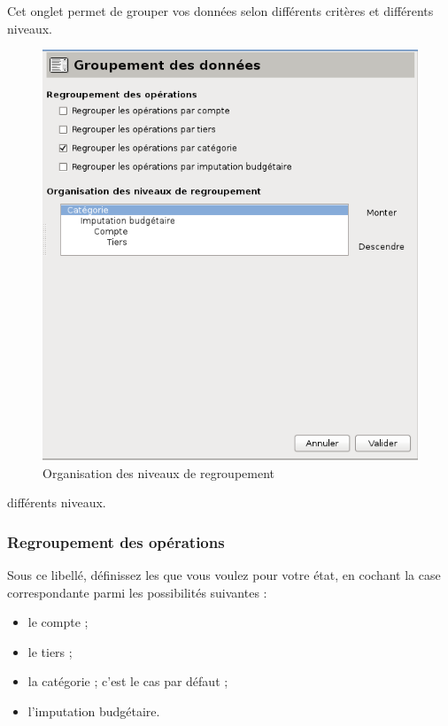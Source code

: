 Cet onglet permet de grouper vos données selon  différents critères et \ifIllustration différents niveaux.
\begin{figure}[htbp]
\begin{center}
\includegraphics[scale=0.5]{image/screenshot/reportcreation_organisation_grouping}
\end{center}
\caption{Organisation des niveaux de regroupement}
\label{reportcreation-organisation-grouping-img}
\end{figure}
\else différents niveaux.
\fi


\subsubsection{Regroupement des opérations\label{reportscreation-organisation-group-operations}}

Sous ce libellé, définissez les  que vous voulez pour votre état, en cochant la case correspondante parmi les possibilités suivantes :

\begin{itemize}
	\item le compte ;
	\item le tiers ;
	\item la catégorie ; c'est le cas par défaut ;
	\item l'imputation budgétaire.
\end{itemize}

